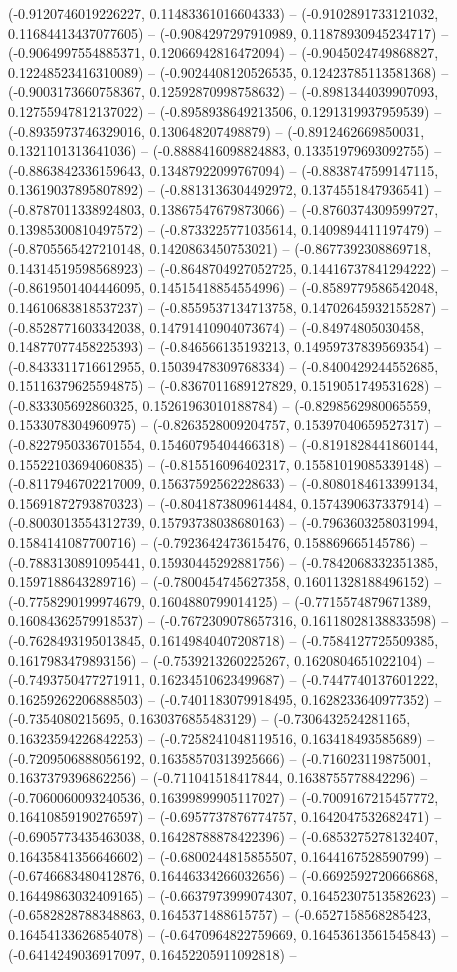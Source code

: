 (-0.9120746019226227, 0.11483361016604333) -- (-0.9102891733121032, 0.11684413437077605) -- (-0.9084297297910989, 0.11878930945234717) -- (-0.9064997554885371, 0.12066942816472094) -- (-0.9045024749868827, 0.12248523416310089) -- (-0.9024408120526535, 0.12423785113581368) -- (-0.9003173660758367, 0.12592870998758632) -- (-0.8981344039907093, 0.12755947812137022) -- (-0.8958938649213506, 0.1291319937959539) -- (-0.8935973746329016, 0.130648207498879) -- (-0.8912462669850031, 0.1321101313641036) -- (-0.8888416098824883, 0.13351979693092755) -- (-0.8863842336159643, 0.13487922099767094) -- (-0.8838747599147115, 0.13619037895807892) -- (-0.8813136304492972, 0.1374551847936541) -- (-0.8787011338924803, 0.13867547679873066) -- (-0.8760374309599727, 0.13985300810497572) -- (-0.8733225771035614, 0.1409894411197479) -- (-0.8705565427210148, 0.1420863450753021) -- (-0.8677392308869718, 0.14314519598568923) -- (-0.8648704927052725, 0.14416737841294222) -- (-0.8619501404446095, 0.14515418854554996) -- (-0.8589779586542048, 0.14610683818537237) -- (-0.8559537134713758, 0.14702645932155287) -- (-0.8528771603342038, 0.14791410904073674) -- (-0.84974805030458, 0.14877077458225393) -- (-0.846566135193213, 0.14959737839569354) -- (-0.8433311716612955, 0.15039478309768334) -- (-0.8400429244552685, 0.15116379625594875) -- (-0.8367011689127829, 0.1519051749531628) -- (-0.833305692860325, 0.15261963010188784) -- (-0.8298562980065559, 0.1533078304960975) -- (-0.8263528009204757, 0.15397040659527317) -- (-0.8227950336701554, 0.15460795404466318) -- (-0.8191828441860144, 0.15522103694060835) -- (-0.815516096402317, 0.15581019085339148) -- (-0.8117946702217009, 0.15637592562228633) -- (-0.8080184613399134, 0.15691872793870323) -- (-0.8041873809614484, 0.1574390637337914) -- (-0.8003013554312739, 0.15793738038680163) -- (-0.7963603258031994, 0.1584141087700716) -- (-0.7923642473615476, 0.158869665145786) -- (-0.7883130891095441, 0.15930445292881756) -- (-0.7842068332351385, 0.1597188643289716) -- (-0.7800454745627358, 0.16011328188496152) -- (-0.7758290199974679, 0.1604880799014125) -- (-0.7715574879671389, 0.16084362579918537) -- (-0.7672309078657316, 0.16118028138833598) -- (-0.7628493195013845, 0.16149840407208718) -- (-0.7584127725509385, 0.1617983479893156) -- (-0.7539213260225267, 0.1620804651022104) -- (-0.7493750477271911, 0.16234510623499687) -- (-0.7447740137601222, 0.16259262206888503) -- (-0.7401183079918495, 0.1628233640977352) -- (-0.7354080215695, 0.1630376855483129) -- (-0.7306432524281165, 0.16323594226842253) -- (-0.7258241048119516, 0.163418493585689) -- (-0.7209506888056192, 0.16358570313925666) -- (-0.716023119875001, 0.1637379396862256) -- (-0.711041518417844, 0.1638755778842296) -- (-0.7060060093240536, 0.16399899905117027) -- (-0.7009167215457772, 0.16410859190276597) -- (-0.6957737876774757, 0.1642047532682471) -- (-0.6905773435463038, 0.16428788878422396) -- (-0.6853275278132407, 0.16435841356646602) -- (-0.6800244815855507, 0.1644167528590799) -- (-0.6746683480412876, 0.16446334266032656) -- (-0.6692592720666868, 0.16449863032409165) -- (-0.6637973999074307, 0.16452307513582623) -- (-0.6582828788348863, 0.1645371488615757) -- (-0.6527158568285423, 0.16454133626854078) -- (-0.6470964822759669, 0.16453613561545843) -- (-0.6414249036917097, 0.16452205911092818) -- 
